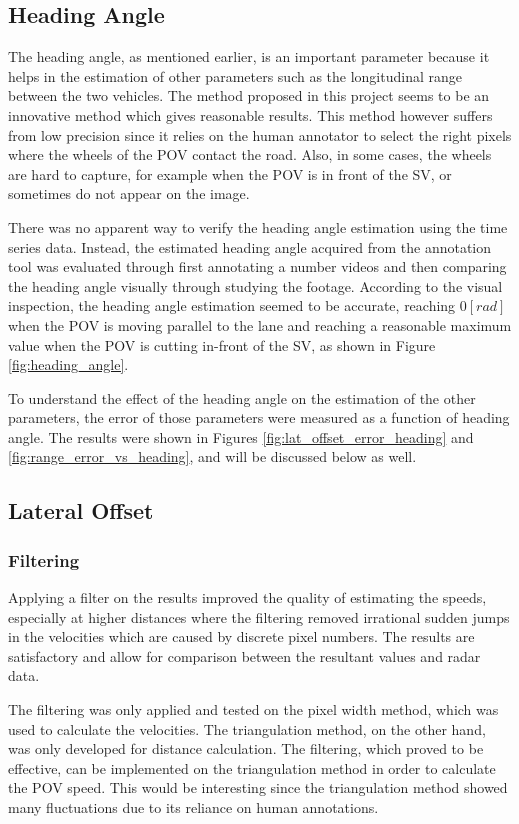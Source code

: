 \subsection{Heading Angle}
\label{sec:heading_angle_discussion}
The heading angle, as mentioned earlier, is an important parameter because it helps in the estimation of other parameters such as the longitudinal range between the two vehicles. The method proposed in this project seems to be an innovative method which gives reasonable results. This method however suffers from low precision since it relies on the human annotator to select the right pixels where the wheels of the POV contact the road. Also, in some cases, the wheels are hard to capture, for example when the POV is in front of the SV, or sometimes do not appear on the image.

There was no apparent way to verify the heading angle estimation using the time series data. Instead, the estimated heading angle acquired from the annotation tool was evaluated through first annotating a number videos and then comparing the heading angle visually through studying the footage. According to the visual inspection, the heading angle estimation seemed to be accurate, reaching $0[rad]$ when the POV is moving parallel to the lane and reaching a reasonable maximum value when the POV is cutting in-front of the SV, as shown in Figure \ref{fig:heading_angle}.

To understand the effect of the heading angle on the estimation of the other parameters, the error of those parameters were measured as a function of heading angle. The results were shown in Figures \ref{fig:lat_offset_error_heading} and \ref{fig:range_error_vs_heading}, and will be discussed below as well.

\subsection{Lateral Offset}
\subsubsection{Filtering}
Applying a filter on the results improved the quality of estimating the speeds, especially at higher distances where the filtering removed irrational sudden jumps in the velocities which are caused by discrete pixel numbers. The results are satisfactory and allow for comparison between the resultant values and radar data. 

The filtering was only applied and tested on the pixel width method, which was used to calculate the velocities. The triangulation method, on the other hand, was only developed for distance calculation. The filtering, which proved to be effective, can be implemented on the triangulation method in order to calculate the POV speed. This would be interesting since the triangulation method showed many fluctuations due to its reliance on human annotations. 


